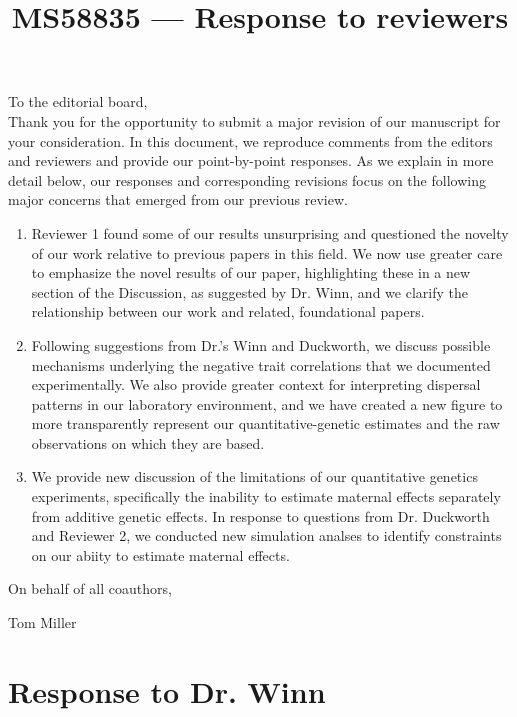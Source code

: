 \documentclass[12pt]{article}
\begin{document}
\title{MS58835 --- Response to reviewers}

\maketitle
\noindent To the editorial board,\\

Thank you for the opportunity to submit a major revision of our manuscript for your consideration. In this document, we reproduce comments from the editors and reviewers and provide our point-by-point responses. As we explain in more detail below, our responses and corresponding revisions focus on the following major concerns that emerged from our previous review.
\begin{enumerate}
\item{Reviewer 1 found some of our results unsurprising and questioned the novelty of our work relative to previous papers in this field. We now use greater care to emphasize the novel results of our paper, highlighting these in a new section of the Discussion, as suggested by Dr. Winn, and we clarify the relationship between our work and related, foundational papers.}
\item{Following suggestions from Dr.'s Winn and Duckworth, we discuss possible mechanisms underlying the negative trait correlations that we documented experimentally. We also provide greater context for interpreting dispersal patterns in our laboratory environment, and we have created a new figure to more transparently represent our quantitative-genetic estimates and the raw observations on which they are based.}
\item{We provide new discussion of the limitations of our quantitative genetics experiments, specifically the inability to estimate maternal effects separately from additive genetic effects. In response to questions from Dr. Duckworth and Reviewer 2, we conducted new simulation analses to identify constraints on our abiity to estimate maternal effects.}
\end{enumerate}

\vspace{2em}
\hfill On behalf of all coauthors,

\hfill Tom Miller
\newpage



\section{Response to Dr. Winn}
\vspace{-2em}
\end{document}
